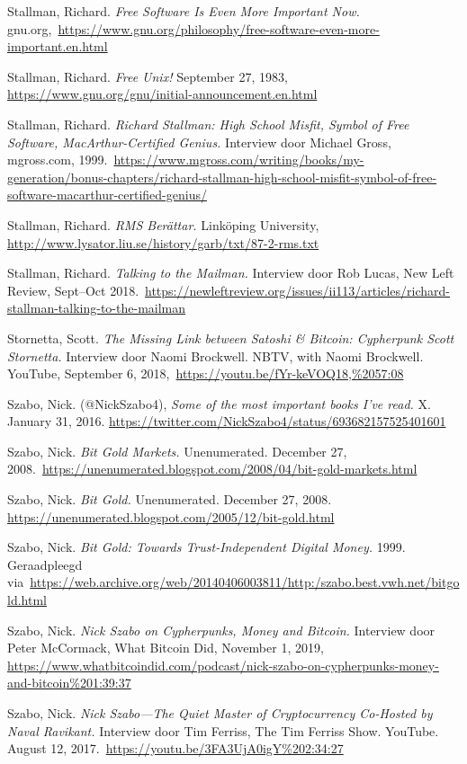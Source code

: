 \documentclass[
  a5paper,
  smalldemyvopaper,11pt,twoside,onecolumn,openright,extrafontsizes,
hidelinks]{memoir}
\begin{document}
{Stallman, Richard. \emph{Free Software Is Even More Important Now.}
gnu.org,~\url{https://www.gnu.org/philosophy/free-software-even-more-important.en.html}

Stallman, Richard. \emph{Free Unix!} September 27, 1983,
\url{https://www.gnu.org/gnu/initial-announcement.en.html}

Stallman, Richard. \emph{Richard Stallman: High School Misfit, Symbol of
Free Software, MacArthur-Certified Genius.} Interview door Michael
Gross, mgross.com,
1999.~\url{https://www.mgross.com/writing/books/my-generation/bonus-chapters/richard-stallman-high-school-misfit-symbol-of-free-software-macarthur-certified-genius/}

Stallman, Richard. \emph{RMS Berättar.} Linköping University,
\url{http://www.lysator.liu.se/history/garb/txt/87-2-rms.txt}

Stallman, Richard. \emph{Talking to the Mailman.} Interview door Rob
Lucas, New Left Review, Sept--Oct
2018.~\url{https://newleftreview.org/issues/ii113/articles/richard-stallman-talking-to-the-mailman}

Stornetta, Scott. \emph{The Missing Link between Satoshi \& Bitcoin:
Cypherpunk Scott Stornetta.} Interview door Naomi Brockwell. NBTV, with
Naomi Brockwell. YouTube, September 6,
2018,~\url{https://youtu.be/fYr-keVOQ18,\%2057:08}

Szabo, Nick. (@NickSzabo4), \emph{Some of the most important books I've
read.} X. January 31, 2016.
\url{https://twitter.com/NickSzabo4/status/693682157525401601}

Szabo, Nick. \emph{Bit Gold Markets.} Unenumerated. December 27,
2008.~\url{https://unenumerated.blogspot.com/2008/04/bit-gold-markets.html}

Szabo, Nick. \emph{Bit Gold.} Unenumerated. December 27, 2008.
\url{https://unenumerated.blogspot.com/2005/12/bit-gold.html}

Szabo, Nick. \emph{Bit Gold: Towards Trust-Independent Digital Money.}
1999. Geraadpleegd
via~\url{https://web.archive.org/web/20140406003811/http:/szabo.best.vwh.net/bitgold.html}

Szabo, Nick. \emph{Nick Szabo on Cypherpunks, Money and Bitcoin.}
Interview door Peter McCormack, What Bitcoin Did, November 1, 2019,
\url{https://www.whatbitcoindid.com/podcast/nick-szabo-on-cypherpunks-money-and-bitcoin\%201:39:37}

Szabo, Nick. \emph{Nick Szabo---The Quiet Master of Cryptocurrency
\textbar{} Co-Hosted by Naval Ravikant.} Interview door Tim Ferriss, The
Tim Ferriss Show. YouTube. August 12,
2017.~\url{https://youtu.be/3FA3UjA0igY\%202:34:27}

}
\end{document}
